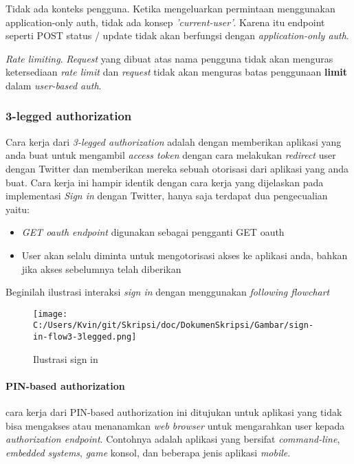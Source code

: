 Tidak ada konteks pengguna. Ketika mengeluarkan permintaan menggunakan application-only auth, tidak ada konsep \textit{'current-user'}. Karena itu endpoint seperti POST status / update tidak akan berfungsi dengan \textit{application-only auth}.

\textit{Rate limiting}. \textit{Request} yang dibuat atas nama pengguna tidak akan menguras ketersediaan \textit{rate limit} dan \textit{request} tidak akan menguras batas penggunaan \textbf{limit} dalam \textit{user-based auth}.


\subsubsection{3-legged authorization}
Cara kerja dari \textit{3-legged authorization} adalah dengan memberikan aplikasi yang anda buat untuk mengambil \textit{access token} dengan cara melakukan \textit{redirect} user dengan Twitter dan memberikan mereka sebuah otorisasi dari aplikasi yang anda buat. Cara kerja ini hampir identik dengan cara kerja yang dijelaskan pada implementasi \textit{Sign in} dengan Twitter, hanya saja terdapat dua pengecualian yaitu:

\begin{itemize}
	\item \textit{GET oauth endpoint} digunakan sebagai pengganti GET oauth
	\item User akan selalu diminta untuk mengotorisasi akses ke aplikasi anda, bahkan jika akses sebelumnya telah diberikan
\end{itemize}

Beginilah ilustrasi interaksi \textit{sign in} dengan menggunakan \textit{following flowchart}

\begin{figure}[hp]
	\centering
		\texttt{[image: C:/Users/Kvin/git/Skripsi/doc/DokumenSkripsi/Gambar/sign-in-flow3-3legged.png]}
	\caption{Ilustrasi sign in}
	\label{fig:sign-in-flow3-3legged}
\end{figure}

\paragraph{PIN-based authorization}
cara kerja dari PIN-based authorization ini ditujukan untuk aplikasi yang tidak bisa mengakses atau menanamkan \textit{web browser} untuk mengarahkan user kepada \textit{authorization endpoint}. Contohnya adalah aplikasi yang bersifat \textit{command-line}, \textit{embedded systems}, \textit{game} konsol, dan beberapa jenis aplikasi \textit{mobile}.


